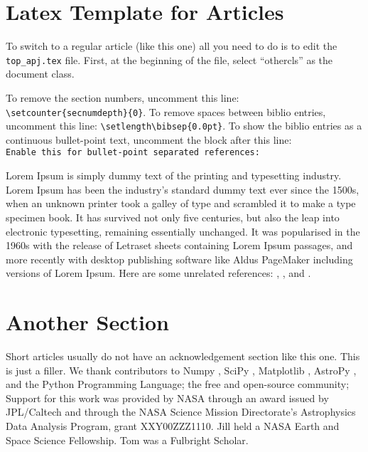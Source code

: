 



\section{Latex Template for Articles}

To switch to a regular article (like this one) all you need to do is
to edit the \verb+top_apj.tex+ file. First, at the beginning of the
file, select ``othercls'' as the document class.


To remove the section numbers, uncomment this line:
\verb+\setcounter{secnumdepth}{0}+.
To remove spaces between biblio entries, uncomment this line:
\verb+\setlength\bibsep{0.0pt}+.
To show the biblio entries as a continuous bullet-point text,
uncomment the block after this line:\\
\verb+Enable this for bullet-point separated references:+


Lorem Ipsum is simply dummy text of the printing and typesetting
industry. Lorem Ipsum has been the industry's standard dummy text ever
since the 1500s, when an unknown printer took a galley of type and
scrambled it to make a type specimen book. It has survived not only
five centuries, but also the leap into electronic typesetting,
remaining essentially unchanged. It was popularised in the 1960s with
the release of Letraset sheets containing Lorem Ipsum passages, and
more recently with desktop publishing software like Aldus PageMaker
including versions of Lorem Ipsum.
Here are some unrelated references:
\citet{Curtis1917paspIslandUniverseTheory},
\citet{Shapley1918apjDistanceGlobularClusters}, and 
\citet{Slipher1913lobAndromedaRarialVelocity}.



\section{Another Section}

Short articles usually do not have an acknowledgement section like
this one.  This is just a filler. We thank contributors to Numpy
\citep{vanderWaltEtal2011numpy}, SciPy \citep{JonesEtal2001scipy},
Matplotlib \citep{Hunter2007ieeeMatplotlib}, AstroPy
\citep{Astropy2013aaAstroPy}, and the Python Programming Language; the
free and open-source community; Support for this work was provided by
NASA through an award issued by JPL/Caltech and through the NASA
Science Mission Directorate's Astrophysics Data Analysis Program,
grant XXY00ZZZ1110.  Jill held a NASA Earth and Space Science
Fellowship.  Tom was a Fulbright Scholar.




